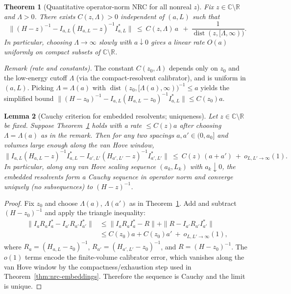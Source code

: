 \documentclass[11pt]{amsart}
\theoremstyle{plain}
\newtheorem{theorem}{Theorem}[section]
\newtheorem{lemma}[theorem]{Lemma}
\theoremstyle{definition}
\theoremstyle{remark}
\begin{document}
\begin{theorem}[Quantitative operator-norm NRC for all nonreal $z$]\label{thm:nrc-quant}
Fix $z\in\mathbb C\setminus\mathbb R$ and $\Lambda>0$. There exists $C(z,\Lambda)>0$ independent of $(a,L)$ such that
\[
  \big\|(H-z)^{-1} - I_{a,L}(H_{a,L}-z)^{-1} I_{a,L}^*\big\|\ \le\ C(z,\Lambda)\,a\ \ +\ \frac{1}{\operatorname{dist}(z,[\Lambda,\infty))}.
\]
In particular, choosing $\Lambda\to\infty$ slowly with $a\downarrow 0$ gives a linear rate $O(a)$ uniformly on compact subsets of $\mathbb C\setminus\mathbb R$.
\end{theorem}
\noindent\emph{Remark (rate and constants).} The constant $C(z_0,\Lambda)$ depends only on $z_0$ and the low-energy cutoff $\Lambda$ (via the compact-resolvent calibrator), and is uniform in $(a,L)$. Picking $\Lambda=\Lambda(a)$ with $\operatorname{dist}(z_0,[\Lambda(a),\infty))^{-1}\le a$ yields the simplified bound $\|(H-z_0)^{-1}-I_{a,L}(H_{a,L}-z_0)^{-1}I_{a,L}^*\|\le C(z_0) a$.
\begin{lemma}[Cauchy criterion for embedded resolvents; uniqueness]\label{lem:cauchy-resolvent-unique}
Let $z\in\mathbb C\setminus\mathbb R$ be fixed. Suppose Theorem~\ref{thm:nrc-quant} holds with a rate $\le C(z) a$ after choosing $\Lambda=\Lambda(a)$ as in the remark. Then for any two spacings $a,a'\in(0,a_0]$ and volumes large enough along the van Hove window,
\[
  \big\| I_{a,L}(H_{a,L}-z)^{-1} I_{a,L}^* - I_{a',L'}(H_{a',L'}-z)^{-1} I_{a',L'}^*\big\|\ \le\ C(z)\,(a+a')\ +\ o_{L,L'\to\infty}(1).
\]
In particular, along any van Hove scaling sequence $(a_k,L_k)$ with $a_k\downarrow 0$, the embedded resolvents form a Cauchy sequence in operator norm and converge uniquely (no subsequences) to $(H-z)^{-1}$.
\end{lemma}
\begin{proof}
Fix $z_0$ and choose $\Lambda(a)$, $\Lambda(a')$ as in Theorem~\ref{thm:nrc-quant}. Add and subtract $(H-z_0)^{-1}$ and apply the triangle inequality:
\[
\begin{aligned}
\| I_{a}R_a I_{a}^* - I_{a'}R_{a'} I_{a'}^* \|
&\le \| I_{a}R_a I_{a}^* - R \| + \| R - I_{a'}R_{a'} I_{a'}^* \|\\
&\le C(z_0) a + C(z_0) a'\ +\ o_{L,L'\to\infty}(1),
\end{aligned}
\]
where $R_a=(H_{a,L}-z_0)^{-1}$, $R_{a'}=(H_{a',L'}-z_0)^{-1}$, and $R=(H-z_0)^{-1}$. The $o(1)$ terms encode the finite-volume calibrator error, which vanishes along the van Hove window by the compactness/exhaustion step used in Theorem~\ref{thm:nrc-embeddings}. Therefore the sequence is Cauchy and the limit is unique.
\end{proof}
\end{document}
